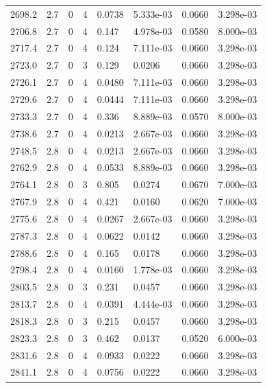 \documentclass[preview]{standalone}
\begin{document}
{{{{{{{{{{{{{\begin{tabular}{L{1.2cm}C{1.2cm} C{0.3cm}C{0.5cm} C{1.4cm}C{1.4cm} C{1.4cm}C{1.4cm}}
  2698.2  &   2.7  & 0     &  4 &  0.0738  & 5.333e-03  & 0.0660 &  3.298e-03   \\ 
  2706.8  &   2.7  & 0     &  4 &  0.147  & 4.978e-03  & 0.0580 &  8.000e-03   \\ 
  2717.4  &   2.7  & 0     &  4 &  0.124  & 7.111e-03  & 0.0660 &  3.298e-03   \\ 
  2723.0  &   2.7  & 0     &  3 &  0.129  & 0.0206  & 0.0660 &  3.298e-03   \\ 
  2726.1  &   2.7  & 0     &  4 &  0.0480  & 7.111e-03  & 0.0660 &  3.298e-03   \\ 
  2729.6  &   2.7  & 0     &  4 &  0.0444  & 7.111e-03  & 0.0660 &  3.298e-03   \\ 
  2733.3  &   2.7  & 0     &  4 &  0.336  & 8.889e-03  & 0.0570 &  8.000e-03   \\ 
  2738.6  &   2.7  & 0     &  4 &  0.0213  & 2.667e-03  & 0.0660 &  3.298e-03   \\ 
  2748.5  &   2.8  & 0     &  4 &  0.0213  & 2.667e-03  & 0.0660 &  3.298e-03   \\ 
  2762.9  &   2.8  & 0     &  4 &  0.0533  & 8.889e-03  & 0.0660 &  3.298e-03   \\ 
  2764.1  &   2.8  & 0     &  3 &  0.805  & 0.0274  & 0.0670 &  7.000e-03   \\ 
  2767.9  &   2.8  & 0     &  4 &  0.421  & 0.0160  & 0.0620 &  7.000e-03   \\ 
  2775.6  &   2.8  & 0     &  4 &  0.0267  & 2.667e-03  & 0.0660 &  3.298e-03   \\ 
  2787.3  &   2.8  & 0     &  4 &  0.0622  & 0.0142  & 0.0660 &  3.298e-03   \\ 
  2788.6  &   2.8  & 0     &  4 &  0.165  & 0.0178  & 0.0660 &  3.298e-03   \\ 
  2798.4  &   2.8  & 0     &  4 &  0.0160  & 1.778e-03  & 0.0660 &  3.298e-03   \\ 
  2803.5  &   2.8  & 0     &  3 &  0.231  & 0.0457  & 0.0660 &  3.298e-03   \\ 
  2813.7  &   2.8  & 0     &  4 &  0.0391  & 4.444e-03  & 0.0660 &  3.298e-03   \\ 
  2818.3  &   2.8  & 0     &  3 &  0.215  & 0.0457  & 0.0660 &  3.298e-03   \\ 
  2823.3  &   2.8  & 0     &  3 &  0.462  & 0.0137  & 0.0520 &  6.000e-03   \\ 
  2831.6  &   2.8  & 0     &  4 &  0.0933  & 0.0222  & 0.0660 &  3.298e-03   \\ 
  2841.1  &   2.8  & 0     &  4 &  0.0756  & 0.0222  & 0.0660 &  3.298e-03   \\ 

\end{tabular}}}}}}}}}}}}}}
\end{document}
